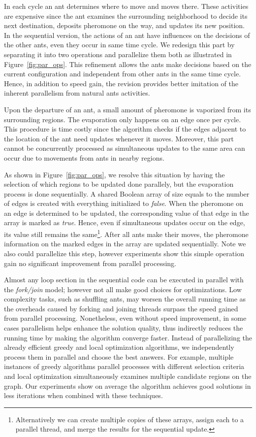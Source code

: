 \documentclass[11pt]{article}
\begin{document}
In each cycle an ant determines where to move and moves there.  These activities are expensive since the ant examines the surrounding neighborhood to decide its next destination, deposits pheromone on the way, and updates its new position.  In the sequential version, the actions of an ant have influences on the decisions of the other ants, even they occur in same time cycle. We redesign this part by separating it into two operations and parallelize them both as illustrated in Figure~\ref{fig:par_ops}.  This refinement allows the ants make decisions based on the current configuration and independent from other ants in the same time cycle.  Hence, in addition to speed gain, the revision provides better imitation of the inherent parallelism from natural ants activities.

Upon the departure of an ant, a small amount of pheromone is vaporized from its surrounding regions. The evaporation only happens on an edge once per cycle. This procedure is time costly since the algorithm checks if the edges adjacent to the location of the ant need updates whenever it moves. Moreover, this part cannot be concurrently processed as simultaneous updates to the same area can occur due to movements from ants in nearby regions.

As shown in Figure~\ref{fig:par_ops}, we resolve this situation by having the selection of which regions to be updated done parallely, but the evaporation process is done sequentially.  A shared Boolean array of size equals to the number of edges is created with everything initialized to \textit{false}.  When the pheromone on an edge is determined to be updated, the corresponding value of that edge in the array is marked as \textit{true}.  Hence, even if simultaneous updates occur on the edge, its value still remains the same\footnote{Alternatively we can create multiple copies of these arrays, assign each to a parallel thread, and merge the results for the sequential update.}. After all ants make their moves, the pheromone information on the marked edges in the array are updated sequentially.  Note we also could parallelize this step, however experiments show this simple operation gain no significant improvement from parallel processing.

Almost any loop section in the sequential code can be executed in parallel with the \textit{fork/join} model; however not all make good choices for optimizations.  Low complexity tasks, such as shuffling ants, may worsen the overall running time as the overheads caused by forking and joining threads surpass the speed gained from parallel processing.  Nonetheless, even without speed improvement, in some cases parallelism helps enhance the solution quality, thus indirectly reduces the running time by making the algorithm converge faster. Instead of parallelizing the already efficient greedy and local optimization algorithms, we independently process them in parallel and choose the best answers.  For example, multiple instances of greedy algorithms parallel processes with different selection criteria and local optimization simultaneously examines multiple candidate regions on the graph. Our experiments show on average the algorithm achieves good solutions in less iterations when combined with these techniques.
\end{document}
